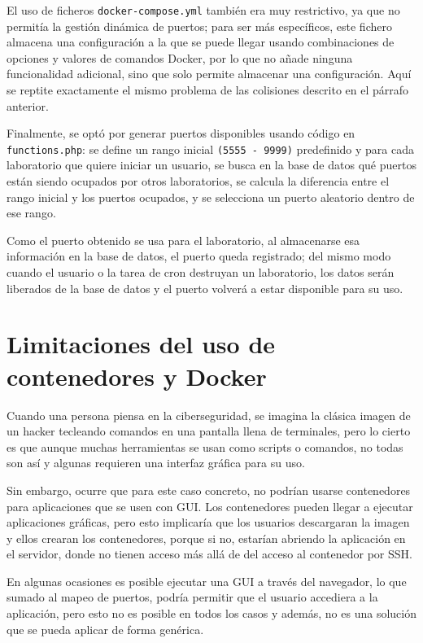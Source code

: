             El uso de ficheros \texttt{docker-compose.yml} también era muy restrictivo, ya que no permitía la gestión dinámica de puertos; para ser más específicos, este fichero almacena una configuración a la que se puede llegar usando combinaciones de opciones y valores de comandos Docker, por lo que no añade ninguna funcionalidad adicional, sino que solo permite almacenar una configuración. Aquí se reptite exactamente el mismo problema de las colisiones descrito en el párrafo anterior.

            Finalmente, se optó por generar puertos disponibles usando código en \texttt{functions.php}: se define un rango inicial \texttt{(5555 - 9999)} predefinido y para cada laboratorio que quiere iniciar un usuario, se busca en la base de datos qué puertos están siendo ocupados por otros laboratorios, se calcula la diferencia entre el rango inicial y los puertos ocupados, y se selecciona un puerto aleatorio dentro de ese rango.

            Como el puerto obtenido se usa para el laboratorio, al almacenarse esa información en la base de datos, el puerto queda registrado; del mismo modo cuando el usuario o la tarea de cron destruyan un laboratorio, los datos serán liberados de la base de datos y el puerto volverá a estar disponible para su uso.


    \section{Limitaciones del uso de contenedores y Docker}
        
        Cuando una persona piensa en la ciberseguridad, se imagina la clásica imagen de un hacker tecleando comandos en una pantalla llena de terminales, pero lo cierto es que aunque muchas herramientas se usan como scripts o comandos, no todas son así y algunas requieren una interfaz gráfica para su uso.

        Sin embargo, ocurre que para este caso concreto, no podrían usarse contenedores para aplicaciones que se usen con GUI. Los contenedores pueden llegar a ejecutar aplicaciones gráficas, pero esto implicaría que los usuarios descargaran la imagen y ellos crearan los contenedores, porque si no, estarían abriendo la aplicación en el servidor, donde no tienen acceso más allá de del acceso al contenedor por SSH.

        En algunas ocasiones es posible ejecutar una GUI a través del navegador, lo que sumado al mapeo de puertos, podría permitir que el usuario accediera a la aplicación, pero esto no es posible en todos los casos y además, no es una solución que se pueda aplicar de forma genérica.
        
